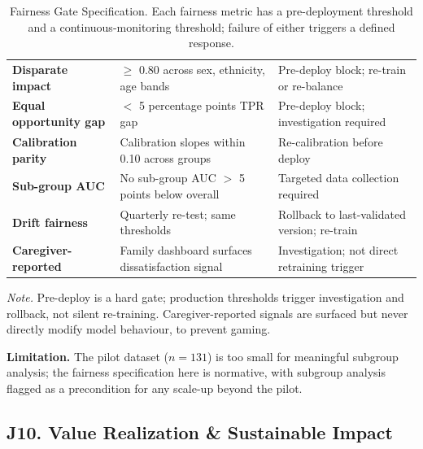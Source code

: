 {\tablestripes\tablefontsize
{}
\begin{xltabular}{\textwidth}{@{} >{\raggedright\arraybackslash}p{3.0cm} L L @{}}
\caption[Fairness Gate Specification]{Fairness Gate Specification. Each fairness metric has a pre-deployment threshold and a continuous-monitoring threshold; failure of either triggers a defined response.}\label{tab:appj_fairness} \\
\toprule
{} &  &  \\
\midrule
\endfirsthead
\endhead
\bottomrule
\endlastfoot
\textbf{Disparate impact}      & $\geq$ 0.80 across sex, ethnicity, age bands & Pre-deploy block; re-train or re-balance \\
\textbf{Equal opportunity gap} & $<$ 5 percentage points TPR gap                & Pre-deploy block; investigation required \\
\textbf{Calibration parity}    & Calibration slopes within 0.10 across groups   & Re-calibration before deploy \\
\textbf{Sub-group AUC}         & No sub-group AUC $>$ 5 points below overall    & Targeted data collection required \\
\textbf{Drift fairness}        & Quarterly re-test; same thresholds              & Rollback to last-validated version; re-train \\
\textbf{Caregiver-reported}    & Family dashboard surfaces dissatisfaction signal & Investigation; not direct retraining trigger \\
\end{xltabular}}
\vspace{0.4em}
\noindent\textit{Note.} Pre-deploy is a hard gate; production thresholds trigger investigation and rollback, not silent re-training. Caregiver-reported signals are surfaced but never directly modify model behaviour, to prevent gaming.

\noindent\textbf{Limitation.} The pilot dataset ($n=131$) is too small for meaningful subgroup analysis; the fairness specification here is normative, with subgroup analysis flagged as a precondition for any scale-up beyond the pilot.

\subsection*{J10. Value Realization \& Sustainable Impact}
\label{sec:appj_value}

